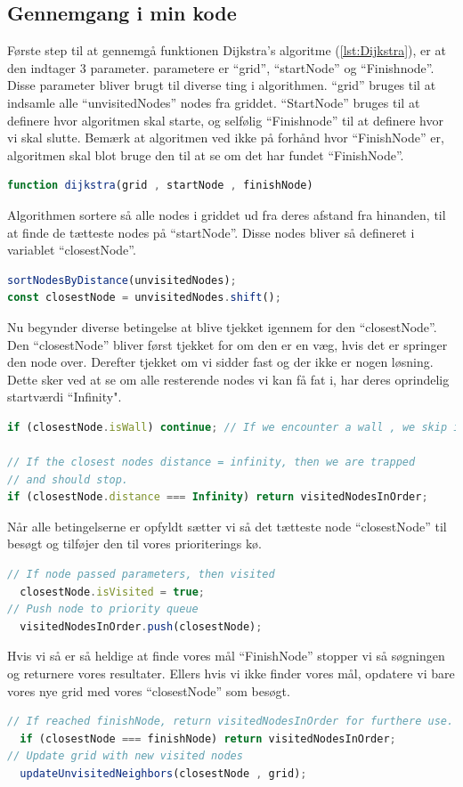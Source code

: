 \documentclass[12pt]{article}
\begin{document}
\subsection{Gennemgang i min kode}
Første step til at gennemgå funktionen Dijkstra’s algoritme (\ref{lst:Dijkstra}), er at den indtager 3 parameter. parametere er “grid”, 
“startNode” og “Finishnode”. Disse parameter bliver brugt til diverse ting i algorithmen.
“grid” bruges til at indsamle alle “unvisitedNodes” nodes fra griddet. 
“StartNode” bruges til at definere hvor algoritmen skal starte, og selfølig “Finishnode” til at definere hvor vi skal slutte. Bemærk at algoritmen ved ikke på forhånd hvor “FinishNode” er, algoritmen skal blot bruge den til at se om det har fundet “FinishNode”.   
\begin{lstlisting}[language=JavaScript]
function dijkstra(grid , startNode , finishNode)
\end{lstlisting}
Algorithmen sortere så alle nodes i griddet ud fra deres afstand fra hinanden, til at finde de tætteste nodes på “startNode”. Disse nodes bliver så defineret i variablet “closestNode”.
\begin{lstlisting}[language=JavaScript]
sortNodesByDistance(unvisitedNodes);
const closestNode = unvisitedNodes.shift();
\end{lstlisting}
Nu begynder diverse betingelse at blive tjekket igennem for den “closestNode”. Den “closestNode” bliver først tjekket for om den er en væg, hvis det er springer den node over. Derefter tjekket om vi sidder fast og der ikke er nogen løsning. Dette sker ved at se om alle resterende nodes vi kan få fat i, har deres oprindelig startværdi “Infinity".
\begin{lstlisting}[language=JavaScript]
if (closestNode.isWall) continue; // If we encounter a wall , we skip it.

// If the closest nodes distance = infinity, then we are trapped
// and should stop.
if (closestNode.distance === Infinity) return visitedNodesInOrder; 
\end{lstlisting}
Når alle betingelserne er opfyldt sætter vi så det tætteste node “closestNode” til besøgt og tilføjer den til vores prioriterings kø. 
\begin{lstlisting}[language=JavaScript]
// If node passed parameters, then visited
  closestNode.isVisited = true;
// Push node to priority queue
  visitedNodesInOrder.push(closestNode);
\end{lstlisting}
Hvis vi så er så heldige at finde vores mål “FinishNode” stopper vi så søgningen og returnere vores resultater. Ellers hvis vi ikke finder vores mål, opdatere vi bare vores nye grid med vores “closestNode” som besøgt. 
\begin{lstlisting}[language=JavaScript]
// If reached finishNode, return visitedNodesInOrder for furthere use.
  if (closestNode === finishNode) return visitedNodesInOrder;
// Update grid with new visited nodes
  updateUnvisitedNeighbors(closestNode , grid);
\end{lstlisting}
\end{document}
